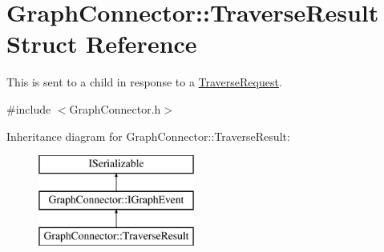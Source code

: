 \hypertarget{struct_graph_connector_1_1_traverse_result}{}\section{Graph\+Connector\+:\+:Traverse\+Result Struct Reference}
\label{struct_graph_connector_1_1_traverse_result}


This is sent to a child in response to a \hyperlink{struct_graph_connector_1_1_traverse_request}{Traverse\+Request}.  




{\ttfamily \#include $<$Graph\+Connector.\+h$>$}

Inheritance diagram for Graph\+Connector\+:\+:Traverse\+Result\+:\begin{figure}[H]
\begin{center}
\leavevmode
\includegraphics[height=3.000000cm]{struct_graph_connector_1_1_traverse_result}
\end{center}
\end{figure}
